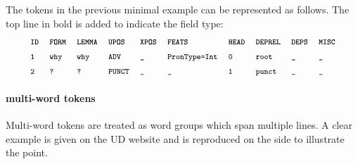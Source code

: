 The tokens in the previous minimal example can be represented as follows. The top line in bold is added to indicate the field type:
\begin{align*}
\conllu{\textbf{ID}}\tab\conllu{\textbf{FORM}}\tab\conllu{\textbf{LEMMA}}\tab\conllu{\textbf{UPOS}}\tab\conllu{\textbf{XPOS}}\tab\conllu{\textbf{FEATS}}\tab\conllu{\textbf{HEAD}}\tab\conllu{\textbf{DEPREL}}\tab\conllu{\textbf{DEPS}}\tab\conllu{\textbf{MISC}}\\
\conllu{1}\tab\conllu{why}\tab\conllu{why}\tab\conllu{ADV}\tab\conllu{\_}\tab\conllu{PronType=Int}\tab\conllu{0}\tab\conllu{root}\tab\conllu{\_}\tab\conllu{\_}\\
\conllu{2}\tab\conllu{?}\tab\conllu{?}\tab\conllu{PUNCT}\tab\conllu{\_}\tab\conllu{\_}\tab\conllu{1}\tab\conllu{punct}\tab\conllu{\_}\tab\conllu{\_}
\end{align*}

\paragraph{multi-word tokens}
Multi-word tokens are treated as word groups which span multiple lines. A clear example is given on the UD website and is reproduced on the side to illustrate the point.





